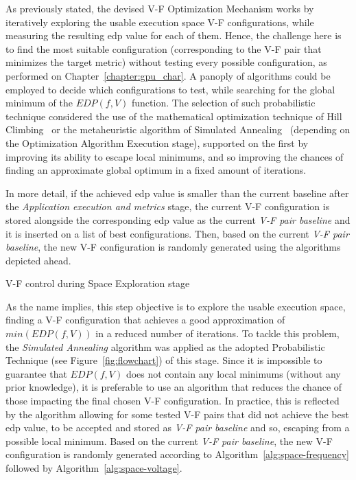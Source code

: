 As previously stated, the devised V-F Optimization Mechanism works by iteratively exploring the usable execution space V-F configurations, while measuring the resulting \acrshort{edp} value for each of them. Hence, the challenge here is to find the most suitable configuration (corresponding to the V-F pair that minimizes the target metric) without testing every possible configuration, as performed on Chapter~\ref{chapter:gpu_char}. A panoply of algorithms could be employed to decide which configurations to test, while searching for the global minimum of the $EDP(f, V)$ function. 
The selection of such probabilistic technique considered the use of the mathematical optimization technique of Hill Climbing~\cite{vaughan_simultaneous_2005} or the metaheuristic algorithm of Simulated Annealing~\cite{kirkpatrick_optimization_1983} (depending on the Optimization Algorithm Execution stage), supported on the first by improving its ability to escape local minimums, and so improving the chances of finding an approximate global optimum in a fixed amount of iterations. 

In more detail, if the achieved \acrshort{edp} value is smaller than the current baseline after the \textit{Application execution and metrics} stage, the current V-F configuration is stored alongside the corresponding \acrshort{edp} value as the current \textit{V-F pair baseline} and it is inserted on a list of best configurations. Then, based on the current \textit{V-F pair baseline}, the new V-F configuration is randomly generated using the algorithms depicted ahead.


\bigskip
V-F control during Space Exploration stage
\bigskip

As the name implies, this step objective is to explore the usable execution space, finding a V-F configuration that achieves a good approximation of $min(EDP(f, V))$ in a reduced number of iterations.
To tackle this problem, the \textit{Simulated Annealing} algorithm was applied as the adopted Probabilistic Technique (see Figure~\ref{fig:flowchart}) of this stage. Since it is impossible to guarantee that $EDP(f, V)$ does not contain any local minimums (without any prior knowledge), it is preferable to use an algorithm that reduces the chance of those impacting the final chosen V-F configuration. In practice, this is reflected by the algorithm allowing for some tested V-F pairs that did not achieve the best \acrshort{edp} value, to be accepted and stored as \textit{V-F pair baseline} and so, escaping from a possible local minimum. Based on the current \textit{V-F pair baseline}, the new V-F configuration is randomly generated according to Algorithm~\ref{alg:space-frequency} followed by Algorithm~\ref{alg:space-voltage}.

